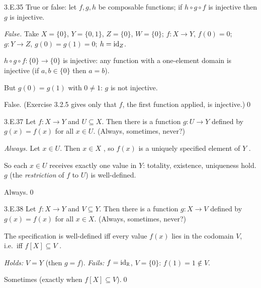 \begin{bookex}[recommended]{3.E.35}
True or false: let $f,g,h$ be composable functions; if $h\circ g\circ f$ is injective then $g$ is injective.
\solution
\begin{steps}
\item \emph{False.} Take $X=\{0\}$, $Y=\{0,1\}$, $Z=\{0\}$, $W=\{0\}$; $f:X\to Y$, $f(0)=0$; $g:Y\to Z$, $g(0)=g(1)=0$; $h=\mathrm{id}_Z$.
\item $h\circ g\circ f:\{0\}\to\{0\}$ is injective: any function with a one-element domain is injective (if $a,b\in\{0\}$ then $a=b$).
\item But $g(0)=g(1)$ with $0\ne1$: $g$ is not injective.
\end{steps}
\conclusion False. (Exercise 3.2.5 gives only that $f$, the first function applied, is injective.)\qed
\end{bookex}

\begin{bookex}[recommended]{3.E.37}
Let $f:X\to Y$ and $U\subseteq X$. Then there is a function $g:U\to Y$ defined by $g(x)=f(x)$ for all $x\in U$. (Always, sometimes, never?)
\solution
\begin{steps}
\item \emph{Always.} Let $x\in U$. Then $x\in X$ , so $f(x)$ is a uniquely specified element of $Y$ .
\item So each $x\in U$ receives exactly one value in $Y$: totality, existence, uniqueness hold. $g$ (the \emph{restriction} of $f$ to $U$) is well-defined.
\end{steps}
\conclusion Always.\qed
\end{bookex}

\begin{bookex}[recommended]{3.E.38}
Let $f:X\to Y$ and $V\subseteq Y$. Then there is a function $g:X\to V$ defined by $g(x)=f(x)$ for all $x\in X$. (Always, sometimes, never?)
\solution
\begin{steps}
\item The specification is well-defined iff every value $f(x)$ lies in the codomain $V$, i.e.\ iff $f[X]\subseteq V$ .
\item \emph{Holds:} $V=Y$ (then $g=f$). \emph{Fails:} $f=\mathrm{id}_{\mathbb{R}}$, $V=\{0\}$: $f(1)=1\notin V$.
\end{steps}
\conclusion Sometimes (exactly when $f[X]\subseteq V$).\qed
\end{bookex}


